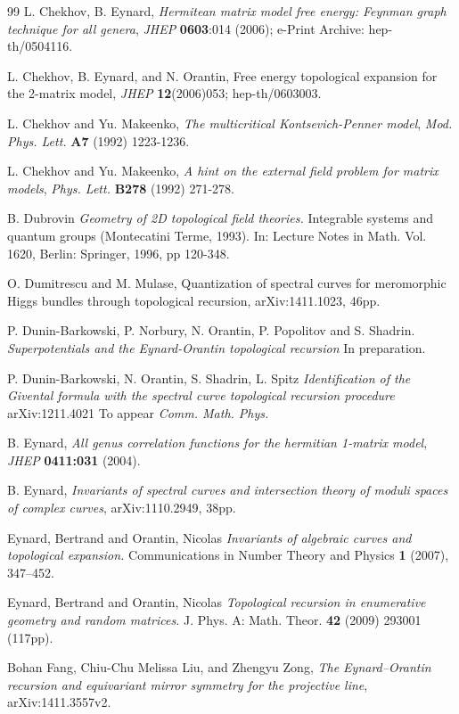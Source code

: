 \documentclass[11pt]{article}
\theoremstyle{plain}
\theoremstyle{definition}
\begin{document}
\begin{thebibliography}{99}
 L. Chekhov, B. Eynard,
{\it  Hermitean matrix model free energy: Feynman graph technique
for all genera}, {\sl JHEP} {\bf 0603}:014
(2006); e-Print Archive: hep-th/0504116.

 L. Chekhov, B. Eynard, and N. Orantin,
Free energy topological expansion for the 2-matrix model,
{\sl JHEP} {\bf 12}(2006)053; hep-th/0603003.


 L. Chekhov and Yu. Makeenko, {\it The multicritical Kontsevich-Penner model},
{\sl Mod. Phys. Lett.} {\bf A7} (1992) 1223-1236.

 L. Chekhov and Yu. Makeenko,
{\it A hint on the external field problem for matrix models},
{\sl Phys. Lett.} {\bf B278} (1992) 271-278.

 B. Dubrovin
\emph{Geometry of 2D topological field theories.}
Integrable systems and quantum groups (Montecatini Terme, 1993). In: Lecture Notes in Math. Vol. 1620, Berlin: Springer, 1996,  pp 120-348.


 O. Dumitrescu and M. Mulase, {Quantization of spectral curves for meromorphic Higgs bundles through topological recursion}, arXiv:1411.1023, 46pp.

 P. Dunin-Barkowski, P. Norbury, N. Orantin, P. Popolitov and S. Shadrin.
\emph{Superpotentials and the Eynard-Orantin topological recursion}
In preparation.

 P. Dunin-Barkowski, N. Orantin, S. Shadrin, L. Spitz
\emph{Identification of the Givental formula with the spectral curve topological recursion procedure}
arXiv:1211.4021  To appear {\em Comm. Math. Phys.}


 B. Eynard, {\it All genus correlation functions for the hermitian 1-matrix model},
{\sl JHEP} {\bf 0411:031} (2004).

 B. Eynard, {\it Invariants of spectral curves and intersection theory of moduli spaces of complex curves},
arXiv:1110.2949, 38pp.

 Eynard, Bertrand and Orantin, Nicolas
\emph{Invariants of algebraic curves and topological expansion.}
Communications in Number Theory and Physics {\bf 1}
(2007), 347--452.

 Eynard, Bertrand and Orantin, Nicolas
\emph{Topological recursion in enumerative geometry and
random matrices.}
J. Phys. A: Math. Theor. {\bf 42} (2009) 293001 (117pp).

Bohan Fang, Chiu-Chu Melissa Liu, and Zhengyu Zong, {\it The Eynard--Orantin recursion and equivariant mirror symmetry for the projective line}, arXiv:1411.3557v2.


\end{thebibliography}
\end{document}
